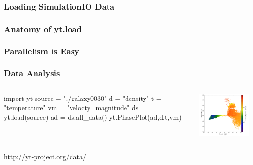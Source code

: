 \documentclass[]{beamer}
\begin{document}
\begin{frame}
  \frametitle{Loading SimulationIO Data}
  
\end{frame}

\begin{frame}
  \frametitle{Anatomy of yt.load}
  
\end{frame}

\begin{frame}
  \frametitle{Parallelism is Easy}
  
\end{frame}

\begin{frame}[fragile]
  \frametitle{Data Analysis}
  \begin{columns}
    \column{5cm}
\begin{python}
import yt
source = "./galaxy0030"
d = "density"
t = "temperature"
vm = "velocty_magnitude"
ds = yt.load(source)
ad = ds.all_data()
yt.PhasePlot(ad,d,t,vm)
\end{python}
    \column{7cm}
    \begin{center}
      \includegraphics[width=7cm]{figures/isolated_galaxy_phase_diagram.pdf}
    \end{center}
  \end{columns}
  \begin{flushright}
    {\footnotesize\url{http://yt-project.org/data/}}
  \end{flushright}
\end{frame}
\end{document}
